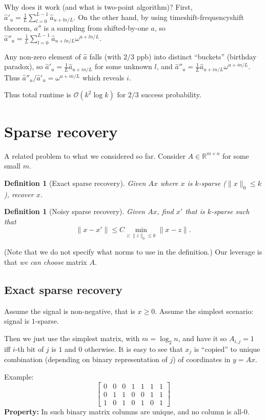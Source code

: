 \documentclass[11pt]{article}
\newtheorem{definition}[theorem]{Definition}
\newcommand{\bigo}{\mathcal{O}}
\begin{document}
Why does it work (and what is two-point algorithm)?
First, $\hat{a}'_u = \frac1L\sum_{l=0}^{L-1} \hat{a}_{u + l n/L}$. On the other hand, by using timeshift-frequencyshift theorem, $a''$ is a sampling from shifted-by-one $a$, so $\hat{a}''_u = \frac1L\sum_{l=0}^{L-1} \hat{a}_{u+ln/L} \omega^{u+ln/L}$.


Any non-zero element of $\hat{a}$ falls (with $2/3$ ppb) into distinct ``buckets'' (birthday paradox), so $\hat{a}'_u = \frac1L\hat{a}_{u+ in/L}$ for some unknown $l$, and $\hat{a}''_u = \frac1L\hat{a}_{u+in/L} \omega^{u+in/L}$. Thus
$\hat{a}''_u / \hat{a}'_u = \omega^{u+in/L}$ which reveals $i$.

Thus total runtime is $\bigo(k^2 \log k)$ for $2/3$ success probability.

\section{Sparse recovery}
A related problem to what we considered so far. Consider $A \in \mathbb{R}^{m \times n}$ for some small $m$.

\begin{definition}[Exact sparse recovery]
Given $Ax$ where $x$ is $k$-sparse ($\|x\|_0 \le k$), recover $x$.
\end{definition}

\begin{definition}[Noisy sparse recovery]
Given $Ax$, find $x'$ that is $k$-sparse such that
$$\|x - x'\| \le C \min_{z : \|z\|_0 \le k} \|x - z\|.$$
\end{definition}
(Note that we do not specify what norms to use in the definition.)
Our leverage is that \emph{we can choose} matrix $A$.

\subsection{Exact sparse recovery}
Assume the signal is non-negative, that is $x \ge 0$. Assume the simplest scenario: signal is $1$-sparse.

Then we just use the simplest matrix, with $m = \log_2 n$, and have it so $A_{i,j} = 1$ iff $i$-th bit of $j$ is $1$ and $0$ otherwise. It is easy to see that $x_j$ is ``copied'' to unique combination (depending on binary representation of $j$) of coordinates in $y = Ax$.

Example:
$$\begin{bmatrix} 0 & 0 & 0 & 1 & 1 & 1 & 1 \\ 0 & 1 & 1 & 0 & 0 & 1 & 1 \\ 1 & 0 & 1 & 0 & 1 & 0 & 1 \end{bmatrix}
$$
\textbf{Property:} In such binary matrix columns are unique, and no column is all-0.
\end{document}
